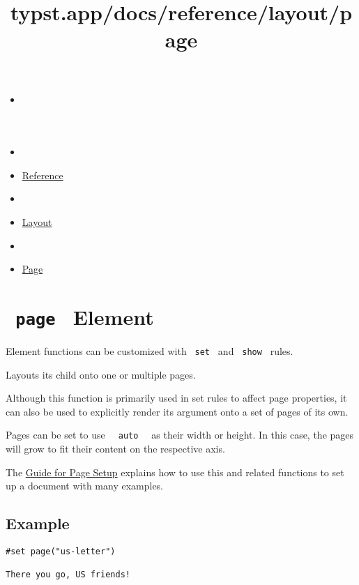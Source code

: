 \title{typst.app/docs/reference/layout/page}

\begin{itemize}
\tightlist
\item
  \href{/docs}{}
\item
  
\item
  \href{/docs/reference/}{Reference}
\item
  
\item
  \href{/docs/reference/layout/}{Layout}
\item
  
\item
  \href{/docs/reference/layout/page/}{Page}
\end{itemize}

\section{\texorpdfstring{\texttt{\ page\ } {{ Element
}}}{ page   Element }}\label{summary}

\label{element-tooltip}
Element functions can be customized with \texttt{\ set\ } and
\texttt{\ show\ } rules.

Layouts its child onto one or multiple pages.

Although this function is primarily used in set rules to affect page
properties, it can also be used to explicitly render its argument onto a
set of pages of its own.

Pages can be set to use \texttt{\ }{\texttt{\ auto\ }}\texttt{\ } as
their width or height. In this case, the pages will grow to fit their
content on the respective axis.

The \href{/docs/guides/page-setup-guide/}{Guide for Page Setup} explains
how to use this and related functions to set up a document with many
examples.

\subsection{Example}\label{example}

\begin{verbatim}
#set page("us-letter")

There you go, US friends!
\end{verbatim}

